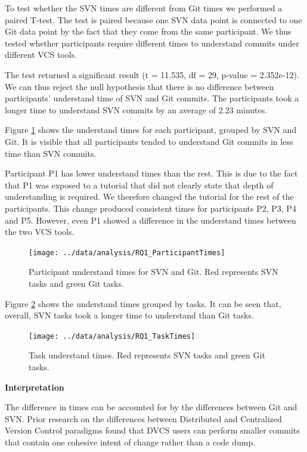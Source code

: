 \documentclass[letterpaper]{article}
\begin{document}
To test whether the SVN times are different from Git times we performed a paired T-test.
The test is paired because one SVN data point is connected to one Git data point by the fact that they come from the same participant.
We thus tested whether participants require different times to understand commits under different VCS tools.

The test returned a significant result (t = 11.535, df = 29, p-value = 2.352e-12). 
We can thus reject the null hypothesis that there is no difference between participants' understand time of SVN and Git commits.
The participants took a longer time to understand SVN commits by an average of 2.23 minutes.

Figure \ref{fig:rq1-participantTimes} shows the understand times for each participant, grouped by SVN and Git.
It is visible that all participants tended to understand Git commits in less time than SVN commits.

Participant P1 has lower understand times than the rest.
This is due to the fact that P1 was exposed to a tutorial that did not clearly state that depth of understanding is required.
We therefore changed the tutorial for the rest of the participants.
This change produced consistent times for participants P2, P3, P4 and P5.
However, even P1 showed a difference in the understand times between the two VCS tools.

\begin{figure}[H]
    \centering
    \texttt{[image: ../data/analysis/RQ1\_ParticipantTimes]}
    \caption{Participant understand times for SVN and Git. Red represents SVN tasks and green Git tasks.}
    \label{fig:rq1-participantTimes}
\end{figure}

Figure \ref{fig:rq1-taskTimes} shows the understand times grouped by tasks.
It can be seen that, overall, SVN tasks took a longer time to understand than Git tasks.

\begin{figure}[H]
    \centering
    \texttt{[image: ../data/analysis/RQ1\_TaskTimes]}
    \caption{Task understand times. Red represents SVN tasks and green Git tasks.}
    \label{fig:rq1-taskTimes}
\end{figure}


\textbf{Interpretation}

The difference in times can be accounted for by the differences between Git and SVN. 
Prior research \cite{brindescu2014centralized} on the differences between Distributed and Centralized Version Control paradigms found that DVCS users can perform smaller commits that contain one cohesive intent of change rather than a code dump.
\end{document}
